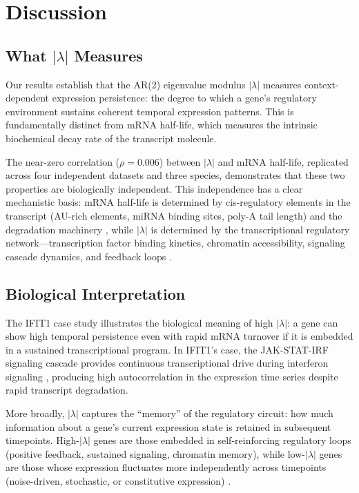 \documentclass[11pt,letterpaper]{article}
\begin{document}
\section{Discussion}

\subsection{What $|\lambda|$ Measures}

Our results establish that the AR(2) eigenvalue modulus $|\lambda|$ measures context-dependent expression persistence: the degree to which a gene's regulatory environment sustains coherent temporal expression patterns. This is fundamentally distinct from mRNA half-life, which measures the intrinsic biochemical decay rate of the transcript molecule.

The near-zero correlation ($\rho = 0.006$) between $|\lambda|$ and mRNA half-life, replicated across four independent datasets and three species, demonstrates that these two properties are biologically independent. This independence has a clear mechanistic basis: mRNA half-life is determined by cis-regulatory elements in the transcript (AU-rich elements, miRNA binding sites, poly-A tail length) and the degradation machinery \citep{chen2008au, bartel2009micrornas}, while $|\lambda|$ is determined by the transcriptional regulatory network---transcription factor binding kinetics, chromatin accessibility, signaling cascade dynamics, and feedback loops \citep{alon2007network, lee2002transcriptional, kouzarides2007chromatin}.

\subsection{Biological Interpretation}

The IFIT1 case study illustrates the biological meaning of high $|\lambda|$: a gene can show high temporal persistence even with rapid mRNA turnover if it is embedded in a sustained transcriptional program. In IFIT1's case, the JAK-STAT-IRF signaling cascade provides continuous transcriptional drive during interferon signaling \citep{schoggins2011diverse, schneider2014interferon}, producing high autocorrelation in the expression time series despite rapid transcript degradation.

More broadly, $|\lambda|$ captures the ``memory'' of the regulatory circuit: how much information about a gene's current expression state is retained in subsequent timepoints. High-$|\lambda|$ genes are those embedded in self-reinforcing regulatory loops (positive feedback, sustained signaling, chromatin memory), while low-$|\lambda|$ genes are those whose expression fluctuates more independently across timepoints (noise-driven, stochastic, or constitutive expression) \citep{raj2008nature, elowitz2002stochastic}.
\end{document}
